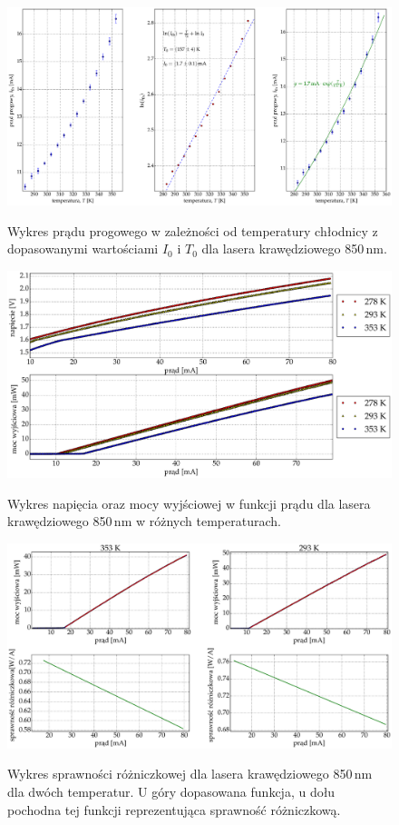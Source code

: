 \begin{figure}
\center
  \includegraphics[scale=0.30]{plot_edge_850/plot_fit.eps}
  \label{rys1}
  \caption{Wykres prądu progowego w zależności od temperatury chłodnicy z dopasowanymi wartościami $I_{0}$ i $T_{0}$ dla lasera krawędziowego 850\,nm.}
  \label{fig:plot_fit_850}
\end{figure}
\begin{figure}
\center
  \includegraphics[scale=0.30]{plot_edge_850/plot_i_v_i_l.eps}
  \label{rys1}
  \caption{Wykres napięcia oraz mocy wyjściowej w funkcji prądu dla lasera krawędziowego 850\,nm w różnych temperaturach.}
  \label{fig:plot_i_v_i_l_850}
\end{figure}
\begin{figure}
\center
  \includegraphics[scale=0.30]{plot_edge_850/eff_via_current4.eps}
  \label{rys1}
  \caption{Wykres sprawności różniczkowej dla lasera krawędziowego 850\,nm dla dwóch temperatur. U góry dopasowana funkcja,
u dołu pochodna tej funkcji reprezentująca sprawność różniczkową.}
  \label{fig:eff_via_current4_850}
\end{figure}
